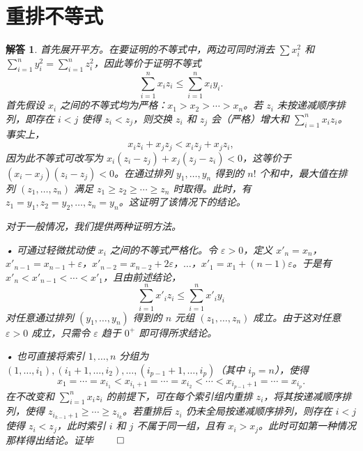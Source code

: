 \documentclass[12pt,UTF8,fontset=none]{ctexbook}
\theoremstyle{exercisestyle}
\theoremstyle{solutionstyle}
\newtheorem*{solution*}{解答}
\newenvironment{solution}
  {\begin{solution*}}
  {\hfill\ensuremath{\qed}\end{solution*}}
\begin{document}
\section{重排不等式}
\begin{solution}
首先展开平方。在要证明的不等式中，两边可同时消去 \(\sum x_i^2\) 和 \(\sum_{i=1}^{n} y_i^2 = \sum_{i=1}^{n} z_i^2\)，因此等价于证明不等式
\[
\sum_{i=1}^{n} x_i z_i \leqslant \sum_{i=1}^{n} x_i y_i.
\]
首先假设 \(x_i\) 之间的不等式均为严格：\(x_1 > x_2 > \cdots > x_n\)。若 \(z_i\) 未按递减顺序排列，即存在 \(i < j\) 使得 \(z_i < z_j\)，则交换 \(z_i\) 和 \(z_j\) 会（严格）增大和 \(\sum_{i=1}^{n} x_i z_i\)。事实上，
\[
x_i z_i + x_j z_j < x_i z_j + x_j z_i,
\]
因为此不等式可改写为 \(x_i(z_i - z_j) + x_j(z_j - z_i) < 0\)，这等价于 \((x_i - x_j)(z_i - z_j) < 0\)。在通过排列 \(y_1, \ldots, y_n\) 得到的 \(n!\) 个和中，最大值在排列 \((z_1, \ldots, z_n)\) 满足 \(z_1 \geqslant z_2 \geqslant \cdots \geqslant z_n\) 时取得。此时，有 \(z_1 = y_1, z_2 = y_2, \ldots, z_n = y_n\)。这证明了该情况下的结论。

对于一般情况，我们提供两种证明方法。

• 可通过轻微扰动使 \(x_i\) 之间的不等式严格化。令 \(\varepsilon > 0\)，定义 \(x'_n = x_n\)，\(x'_{n-1} = x_{n-1} + \varepsilon\)，\(x'_{n-2} = x_{n-2} + 2\varepsilon\)，\(\ldots\)，\(x'_1 = x_1 + (n-1)\varepsilon\)。于是有 \(x'_n < x'_{n-1} < \cdots < x'_1\)，且由前述结论，
\[
\sum_{i=1}^{n} x'_i z_i \leqslant \sum_{i=1}^{n} x'_i y_i
\]
对任意通过排列 \((y_1, \ldots, y_n)\) 得到的 \(n\) 元组 \((z_1, \ldots, z_n)\) 成立。由于这对任意 \(\varepsilon > 0\) 成立，只需令 \(\varepsilon\) 趋于 \(0^+\) 即可得所求结论。

• 也可直接将索引 \(1, \ldots, n\) 分组为 \((1, \ldots, i_1), (i_1 + 1, \ldots, i_2), \ldots, (i_{p-1} + 1, \ldots, i_p)\)（其中 \(i_p = n\)），使得
\[
x_1 = \cdots = x_{i_1} < x_{i_1+1} = \cdots = x_{i_2} < \cdots < x_{i_{p-1}+1} = \cdots = x_{i_p}.
\]
在不改变和 \(\sum_{i=1}^{n} x_i z_i\) 的前提下，可在每个索引组内重排 \(z_i\)，将其按递减顺序排列，使得 \(z_{i_{k-1}+1} \geqslant \cdots \geqslant z_{i_k}\)。若重排后 \(z_i\) 仍未全局按递减顺序排列，则存在 \(i < j\) 使得 \(z_i < z_j\)，此时索引 \(i\) 和 \(j\) 不属于同一组，且有 \(x_i > x_j\)。此时可如第一种情况那样得出结论。证毕
\end{solution}
\end{document}
